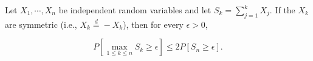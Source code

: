 Let $X_1, \cdots, X_n$ be independent random variables and let $S_k = \sum_{j=1}^{k} X_j$. If the $X_k$ are symmetric (i.e., $X_k \overset{d}{=} -X_k$), then for every $\epsilon > 0$,

$$P\left[\max_{1 \leq k \leq n} S_k \geq \epsilon\right] \leq 2 P[S_n \geq \epsilon].$$
